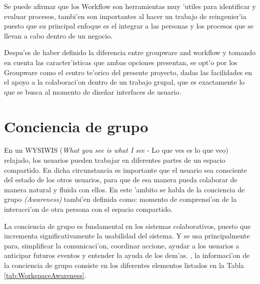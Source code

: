 Se puede afirmar que los Workflow son herramientas muy 'utiles para identificar y evaluar procesos, tambi'en son importantes al hacer un trabajo de reingenier'ia puesto que su principal enfoque es el integrar a las personas y los procesos que se llevan a cabo dentro de un negocio.

\medskip
Despu'es de haber definido la diferencia entre groupware and workflow y tomando en cuenta las caracter'isticas que ambas opciones presentan, se opt'o por los Groupware como el centro te'orico del presente proyecto, dadas las facilidades en el apoyo a la colaboraci'on dentro de un trabajo grupal, que es exactamente lo que se busca al momento de dise\~nar interfaces de usuario.


\section{Conciencia de grupo}
En un WYSIWIS (\textit{What you see is what I see} - Lo que ves es lo que veo) relajado, los usuarios pueden trabajar en diferentes partes de un espacio compartido. En dicha circunstancia es importante que el usuario sea consciente del estado de los otros usuarios, para que de esa manera pueda colaborar de manera natural y fluida con ellos. En este 'ambito se habla de la conciencia de grupo \textit{(Awareness)} tambi'en definida como: momento de comprensi'on de la interacci'on de otra persona con el espacio compartido. \cite{gutwin1996workspace}

\medskip
La conciencia de grupo es fundamental en los sistemas colaborativos, puesto que incrementa significativamente la usabilidad del sistema. Y se usa principalmente para, simplificar la comunicaci'on, coordinar accione, ayudar a los usuarios a anticipar futuros eventos y entender la ayuda de los dem'as. \cite{gutwin1996workspace}, la informaci'on de la conciencia de grupo consiste en los diferentes elementos listados en la Tabla \ref{tab:WorkspaceAwareness}.

